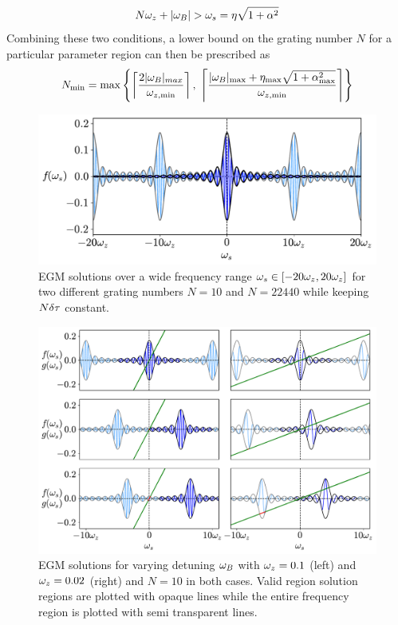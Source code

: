 %
\begin{equation*}
    N \omega_z + |\omega_B| > \omega_s = \eta \sqrt{1+\alpha^2}
\end{equation*}
%
Combining these two conditions, a lower bound on the grating number $N$ for a particular parameter region can then be prescribed as
%
\begin{equation}
    \label{eq:Nmin}
    N_\text{min} = \max \left\{ \left\lceil \frac{2|\omega_B|_{max}}{\omega_{z,\min}} \right\rceil , \;\left\lceil \frac{|\omega_B|_{\max} + \eta_{\max} \sqrt{1+\alpha_{\max}^2}}{\omega_{z,\min}} \right\rceil \right\}
\end{equation}
%
\begin{figure}[!t]
    \centering
    
    \includegraphics[width=0.75\linewidth]{Images/Chapter 2/discretised_EGM_wideview.pdf}
    
    \caption{EGM solutions over a wide frequency range $\omega_s \in [-20\omega_z, 20\omega_z]$ for two different grating numbers $N = 10$ and $N = 22440$ while keeping $N\delta \tau$ constant.}
    
    \label{fig:discretised_EGM_wide_view}
\end{figure}
%
\begin{figure}[!t]
    \centering
    
    \includegraphics[width=0.94\linewidth]{Images/Chapter 2/discretised_EGM_minimumN.pdf}
    
    \caption{EGM solutions for varying detuning $\omega_B$ with $\omega_z=0.1$ (left) and $\omega_z=0.02$ (right) and $N=10$ in both cases. Valid region solution regions are plotted with opaque lines while the entire frequency region is plotted with semi transparent lines.}
    
    \label{fig:discretised_EGM_minimumN}
\end{figure}
